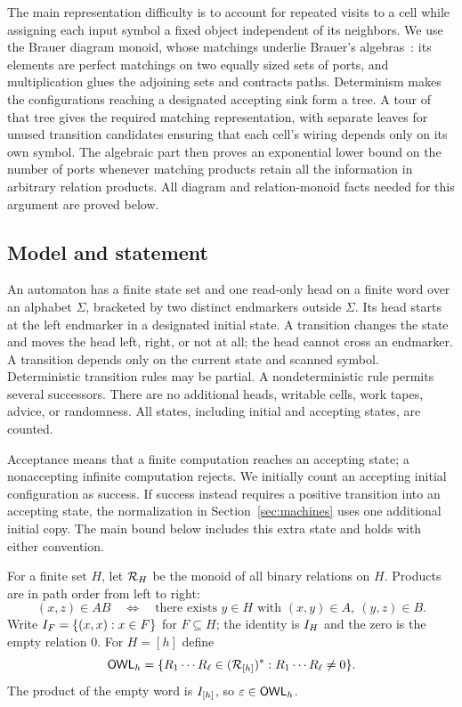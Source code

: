The main representation difficulty is to account for repeated visits to
a cell while assigning each input symbol a fixed object independent of
its neighbors. We use the Brauer diagram monoid, whose matchings
underlie Brauer's algebras~\cite{Brauer1937,Auinger2012}:
its elements are perfect matchings on two equally sized sets of ports,
and multiplication glues the adjoining sets and contracts paths.
Determinism makes the configurations reaching a designated accepting
sink form a tree. A tour of that tree gives the required matching
representation, with separate leaves for unused transition candidates
ensuring that each cell's wiring depends only on its own symbol.
The algebraic part then proves an exponential lower bound on the number
of ports whenever matching products retain all the information in
arbitrary relation products. All diagram and relation-monoid facts
needed for this argument are proved below.

\subsection{Model and statement}

An automaton has a finite state set and one read-only head on a finite word
over an alphabet $\Sigma$, bracketed by two distinct endmarkers outside
$\Sigma$. Its head starts at the left endmarker in a designated initial
state. A transition changes the state and moves the head left, right, or
not at all; the head cannot cross an endmarker. A transition depends only
on the current state and scanned symbol. Deterministic transition rules
may be partial. A nondeterministic rule permits several successors.
There are no additional heads, writable cells, work tapes, advice, or
randomness. All states, including initial and accepting states, are counted.

Acceptance means that a finite computation reaches an accepting state;
a nonaccepting infinite computation rejects. We initially count an
accepting initial configuration as success. If success instead requires
a positive transition into an accepting state, the normalization in
Section~\ref{sec:machines} uses one additional initial copy. The main
bound below includes this extra state and holds with either convention.

For a finite set $H$, let $\mathcal R_{H}$ be the monoid of all binary relations
on $H$. Products are in path order from left to right:
\[
 (x,z)\in AB
 \quad\Longleftrightarrow\quad
 \text{there exists }y\in H\text{ with }(x,y)\in A,\ (y,z)\in B.
\]
Write $I_{F}=\{(x,x):x\in F\}$ for $F\subseteq H$; the identity is
$I_{H}$ and the zero is the empty relation $0$. For $H=[h]$ define
\begin{equation}
\label{eq:liveness-language}
 \mathsf{OWL}_h=\{R_1\cdots R_\ell\in(\mathcal R_{[h]})^*:
                  R_1\cdots R_\ell\ne0\}.
\end{equation}
The product of the empty word is $I_{[h]}$, so $\varepsilon\in\mathsf{OWL}_h$.

